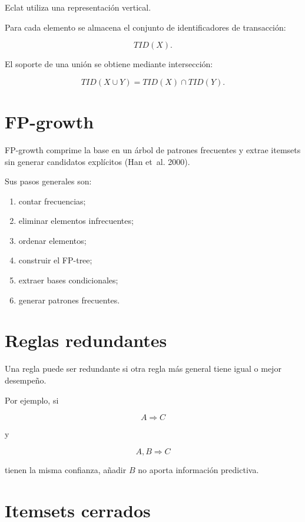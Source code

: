 \documentclass[
  spanish,
  10.5pt,
  letterpaper,
  DIV=11,
  numbers=noendperiod,
  oneside,
  open=any]{scrreprt}
\providecommand{\tightlist}{%
  \setlength{\itemsep}{0pt}\setlength{\parskip}{0pt}}
\theoremstyle{definition}
\theoremstyle{definition}
\theoremstyle{plain}
\theoremstyle{remark}
\begin{document}

Eclat utiliza una representación vertical.

Para cada elemento se almacena el conjunto de identificadores de
transacción:

\[
TID(X).
\]

El soporte de una unión se obtiene mediante intersección:

\[
TID(X\cup Y)
=
TID(X)\cap TID(Y).
\]

\section*{FP-growth}\label{fp-growth}


FP-growth comprime la base en un árbol de patrones frecuentes y extrae
itemsets sin generar candidatos explícitos (Han et~al. 2000).

Sus pasos generales son:

\begin{enumerate}
\def\labelenumi{\arabic{enumi}.}
\tightlist
\item
  contar frecuencias;
\item
  eliminar elementos infrecuentes;
\item
  ordenar elementos;
\item
  construir el FP-tree;
\item
  extraer bases condicionales;
\item
  generar patrones frecuentes.
\end{enumerate}

\section*{Reglas redundantes}\label{reglas-redundantes}


Una regla puede ser redundante si otra regla más general tiene igual o
mejor desempeño.

Por ejemplo, si

\[
A\Rightarrow C
\]

y

\[
A,B\Rightarrow C
\]

tienen la misma confianza, añadir \(B\) no aporta información
predictiva.

\section*{Itemsets cerrados}\label{itemsets-cerrados}
\end{document}
